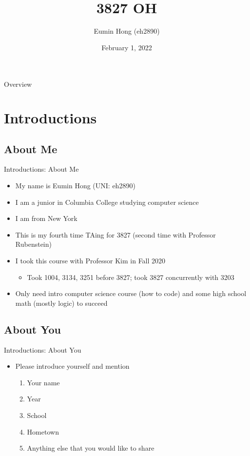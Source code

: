 \documentclass{../slides}
\title{3827 OH}
\author{Eumin Hong (eh2890)}
\institute{Columbia University}
\date{February 1, 2022}
\begin{document}
\begin{frame}
    \titlepage
\end{frame}

\begin{frame}{Overview}
\tableofcontents
\end{frame}

\section{Introductions}
\subsection{About Me}
\begin{frame}{Introductions: About Me}
    \begin{itemize}
        \item My name is Eumin Hong (UNI: eh2890)
        \item I am a junior in Columbia College studying computer science
        \item I am from New York
        \item This is my fourth time TAing for 3827 (second time with Professor Rubenstein)
        \item I took this course with Professor Kim in Fall 2020
        \begin{itemize}
            \item Took 1004, 3134, 3251 before 3827; took 3827 concurrently with 3203
        \end{itemize}
        \item Only need intro computer science course (how to code) and some high school math (mostly logic) to succeed
    \end{itemize}
\end{frame}

\subsection{About You}
\begin{frame}{Introductions: About You}
    \begin{itemize}
        \item Please introduce yourself and mention
        \begin{enumerate}
            \item Your name
            \item Year
            \item School
            \item Hometown
            \item Anything else that you would like to share
        \end{enumerate}
    \end{itemize}
\end{frame}
\end{document}
